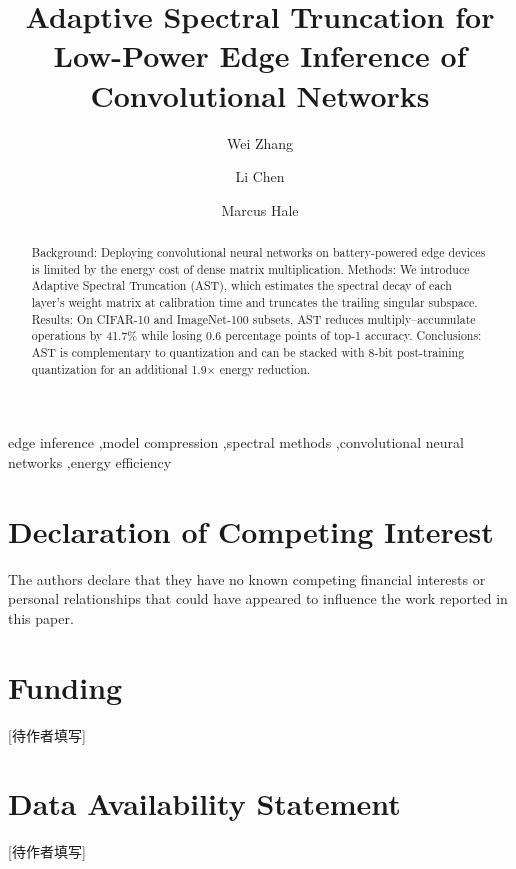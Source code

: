 \documentclass[preprint,12pt]{elsarticle}
\newcommand{\method}{Adaptive Spectral Truncation (AST)}
\begin{document}
\begin{frontmatter}
\title{Adaptive Spectral Truncation for Low-Power Edge Inference of Convolutional Networks}

\author[aff1]{Wei Zhang}
\author[aff1,aff2]{Li Chen}
\author[aff3]{Marcus Hale}

\begin{abstract}
Background: Deploying convolutional neural networks on battery-powered edge devices is
limited by the energy cost of dense matrix multiplication.
Methods: We introduce \method{}, which estimates the spectral decay of each layer's
weight matrix at calibration time and truncates the trailing singular subspace.
Results: On CIFAR-10 and ImageNet-100 subsets, AST reduces multiply--accumulate operations
by 41.7\% while losing 0.6 percentage points of top-1 accuracy.
Conclusions: AST is complementary to quantization and can be stacked with 8-bit
post-training quantization for an additional 1.9$\times$ energy reduction.
\end{abstract}

\begin{keyword}
edge inference \sep model compression \sep spectral methods \sep convolutional neural networks \sep energy efficiency
\end{keyword}
\end{frontmatter}






\section*{Declaration of Competing Interest}
The authors declare that they have no known competing financial interests or personal
relationships that could have appeared to influence the work reported in this paper.

\section*{Funding}
[待作者填写]
\section*{Data Availability Statement}
[待作者填写]



\end{document}
